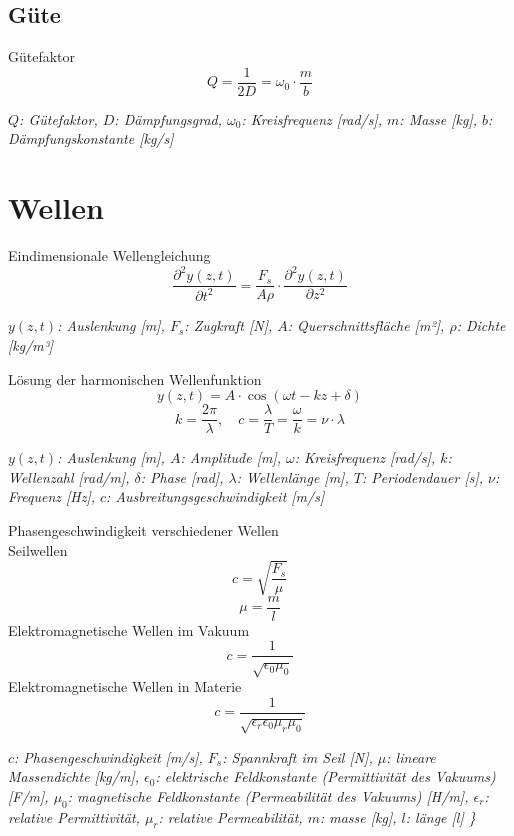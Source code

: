 \documentclass[a4paper,10pt]{article}
\newenvironment{displayformula}
{
	\begin{framed}
		\color{formulaColor}
	}
	{\end{framed}}
\newcommand{\formulalegend}[1]{%
	\par\vspace{0.5ex}%
	{{\color{legendColor}\RaggedRight\small\textit{#1}}}%
	\par\vspace{1.5ex}%
}
\begin{document}
\subsection{Güte}

\begin{displayformula}
	Gütefaktor
	\[
	Q = \frac{1}{2D} = \omega_0 \cdot \frac{m}{b}
	\]
\end{displayformula}
\formulalegend{
	\( Q \): Gütefaktor, \( D \): Dämpfungsgrad, \( \omega_0 \): Kreisfrequenz [rad/s], \( m \): Masse [kg], \( b \): Dämpfungskonstante [kg/s]
}

\section{Wellen}

\begin{displayformula}
	Eindimensionale Wellengleichung
	\[
	\frac{\partial^2 y(z,t)}{\partial t^2} = \frac{F_s}{A \rho} \cdot \frac{\partial^2 y(z,t)}{\partial z^2}
	\]
\end{displayformula}
\formulalegend{
	\( y(z,t) \): Auslenkung [m], \( F_s \): Zugkraft [N], \( A \): Querschnittsfläche [m²], \( \rho \): Dichte [kg/m³]
}

\begin{displayformula}
	Lösung der harmonischen Wellenfunktion
	\[
	y(z, t) = A \cdot \cos(\omega t - kz + \delta)
	\]
	\[
	k = \frac{2\pi}{\lambda}, \quad c = \frac{\lambda}{T} = \frac{\omega}{k} = \nu \cdot \lambda
	\]
\end{displayformula}
\formulalegend{
	\( y(z,t) \): Auslenkung [m], \( A \): Amplitude [m], \( \omega \): Kreisfrequenz [rad/s], \( k \): Wellenzahl [rad/m], \( \delta \): Phase [rad], \( \lambda \): Wellenlänge [m], \( T \): Periodendauer [s], \( \nu \): Frequenz [Hz], \( c \): Ausbreitungsgeschwindigkeit [m/s]
}


\begin{displayformula}
	Phasengeschwindigkeit verschiedener Wellen \\ 
	Seilwellen
	\[
	c = \sqrt{\frac{F_s}{\mu}}
	\]
		\[
	\mu = \frac{m}{l}
	\]
	Elektromagnetische Wellen im Vakuum
	\[
	c = \frac{1}{\sqrt{\epsilon_0 \mu_0}}
	\]
	Elektromagnetische Wellen in Materie
	\[
	c = \frac{1}{\sqrt{\epsilon_r \epsilon_0 \mu_r \mu_0}}
	\]
\end{displayformula}
\formulalegend{
	\( c \): Phasengeschwindigkeit [m/s], 
	\( F_s \): Spannkraft im Seil [N], 
	\( \mu \): lineare Massendichte [kg/m], 
	\( \epsilon_0 \): elektrische Feldkonstante (Permittivität des Vakuums) [F/m], 
	\( \mu_0 \): magnetische Feldkonstante (Permeabilität des Vakuums) [H/m], 
	\( \epsilon_r \): relative Permittivität, 
	\( \mu_r \): relative Permeabilität,
	\(m\): masse [kg],
	\(l\): länge [l]
	\}
}
\end{document}
